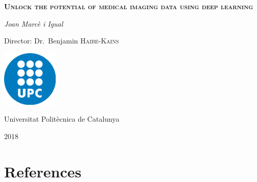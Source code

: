 \documentclass[a4paper, 12pt]{article}
\begin{document}
\begin{titlepage}
  \centering
  \vspace{1.5cm}
  {\huge \textbf{\textsc{Unlock the potential of medical imaging data using deep learning}} \par}
  \vspace{2cm}
  {\Large \textit{Joan Marcè i Igual}\par}
  \vfill
  Director: Dr.~Benjamin \textsc{Haibe-Kains}
  
  \vfill

  \includegraphics[width=0.2\textwidth]{images/logo_upc}\par\vspace{1cm}
  \vfill
  
  {\LARGE Universitat Politècnica de Catalunya \par}
  {\LARGE 2018 \par}
\end{titlepage}

\tableofcontents
\listoffigures
\listoftables

\pagebreak







\pagebreak
\section{References}
\printbibliography[heading=none]{}
\end{document}

